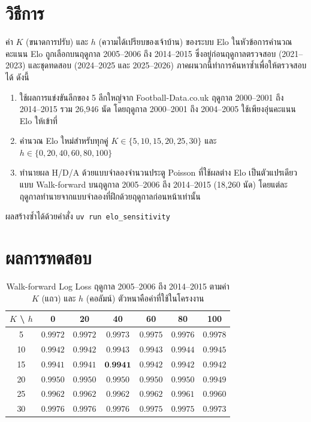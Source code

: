 \section*{วิธีการ}

ค่า $K$ (ขนาดการปรับ) และ $h$ (ความได้เปรียบของเจ้าบ้าน) ของระบบ Elo ในหัวข้อการคำนวณคะแนน Elo ถูกเลือกบนฤดูกาล 2005--2006 ถึง 2014--2015 ซึ่งอยู่ก่อนฤดูกาลตรวจสอบ (2021--2023) และชุดทดสอบ (2024--2025 และ 2025--2026) ภาคผนวกนี้ทำการค้นหาซ้ำเพื่อให้ตรวจสอบได้ ดังนี้

\begin{enumerate}[label=\arabic*)]
    \item ใช้ผลการแข่งขันลีกของ 5 ลีกใหญ่จาก Football-Data.co.uk ฤดูกาล 2000--2001 ถึง 2014--2015 รวม 26,946 นัด โดยฤดูกาล 2000--2001 ถึง 2004--2005 ใช้เพียงอุ่นคะแนน Elo ให้เข้าที่
    \item คำนวณ Elo ใหม่สำหรับทุกคู่ $K \in \{5, 10, 15, 20, 25, 30\}$ และ $h \in \{0, 20, 40, 60, 80, 100\}$
    \item ทำนายผล H/D/A ด้วยแบบจำลองจำนวนประตู Poisson ที่ใช้ผลต่าง Elo เป็นตัวแปรเดียว แบบ Walk-forward บนฤดูกาล 2005--2006 ถึง 2014--2015 (18,260 นัด) โดยแต่ละฤดูกาลทำนายจากแบบจำลองที่ฝึกด้วยฤดูกาลก่อนหน้าเท่านั้น
\end{enumerate}

ผลสร้างซ้ำได้ด้วยคำสั่ง \texttt{uv run elo\_sensitivity}

\section*{ผลการทดสอบ}

\begin{table}[H]
\centering
\caption{Walk-forward Log Loss ฤดูกาล 2005--2006 ถึง 2014--2015 ตามค่า $K$ (แถว) และ $h$ (คอลัมน์) ตัวหนาคือค่าที่ใช้ในโครงงาน}
\label{tab:elo_sensitivity}
\begin{tabular}{|c|c|c|c|c|c|c|}
\hline
$K$ \textbackslash{} $h$ & 0 & 20 & 40 & 60 & 80 & 100 \\
\hline
5 & $0.9972$ & $0.9972$ & $0.9973$ & $0.9975$ & $0.9976$ & $0.9978$ \\
10 & $0.9942$ & $0.9942$ & $0.9943$ & $0.9943$ & $0.9944$ & $0.9945$ \\
15 & $0.9941$ & $0.9941$ & $\textbf{0.9941}$ & $0.9942$ & $0.9942$ & $0.9942$ \\
20 & $0.9950$ & $0.9950$ & $0.9950$ & $0.9950$ & $0.9950$ & $0.9949$ \\
25 & $0.9962$ & $0.9962$ & $0.9962$ & $0.9962$ & $0.9961$ & $0.9960$ \\
30 & $0.9976$ & $0.9976$ & $0.9976$ & $0.9975$ & $0.9975$ & $0.9973$ \\
\hline
\end{tabular}
\end{table}

